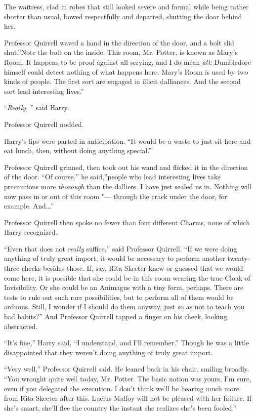 The waitress, clad in robes that still looked severe and formal while
being rather shorter than usual, bowed respectfully and departed,
shutting the door behind her.

Professor Quirrell waved a hand in the direction of the door, and a bolt
slid shut.''Note the bolt on the inside. This room, Mr. Potter, is known
as Mary's Room. It happens to be proof against all scrying, and I do
mean \emph{all;} Dumbledore himself could detect nothing of what happens
here. Mary's Room is used by two kinds of people. The first sort are
engaged in illicit dalliances. And the second sort lead interesting
lives.''

``\emph{Really,} '' said Harry.

Professor Quirrell nodded.

Harry's lips were parted in anticipation. ``It would be a waste to just
sit here and eat lunch, then, without doing anything special.''

Professor Quirrell grinned, then took out his wand and flicked it in the
direction of the door. ``Of course,'' he said,''people who lead
interesting lives take precautions more \emph{thorough} than the
dalliers. I have just sealed us in. Nothing will now pass in or out of
this room "--- through the crack under the door, for example. And...''

Professor Quirrell then spoke no fewer than four different Charms, none
of which Harry recognized.

``Even that does not \emph{really} suffice,'' said Professor Quirrell.
``If we were doing anything of truly great import, it would be necessary
to perform another twenty-three checks besides those. If, say, Rita
Skeeter knew or guessed that we would come here, it is possible that she
could be in this room wearing the true Cloak of Invisibility. Or she
could be an Animagus with a tiny form, perhaps. There are tests to rule
out such rare possibilities, but to perform all of them would be
arduous. Still, I wonder if I should do them anyway, just so as not to
teach you bad habits?'' And Professor Quirrell tapped a finger on his
cheek, looking abstracted.

``It's fine,'' Harry said, ``I understand, and I'll remember.'' Though
he was a little disappointed that they weren't doing anything of truly
great import.

``Very well,'' Professor Quirrell said. He leaned back in his chair,
smiling broadly. ``You wrought quite well today, Mr. Potter. The basic
notion was yours, I'm sure, even if you delegated the execution. I don't
think we'll be hearing much more from Rita Skeeter after this. Lucius
Malfoy will not be pleased with her failure. If she's smart, she'll flee
the country the instant she realizes she's been fooled.''

